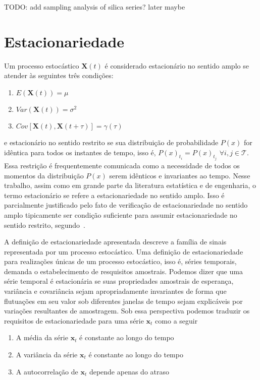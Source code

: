 TODO: add sampling analysis of silica series? later maybe

\section{Estacionariedade}\label{sec:stationarity}

Um processo estocástico $\mathbf{X}(t)$ é considerado estacionário no
sentido amplo se atender às seguintes três condições:

\begin{enumerate}
    \item $E(\mathbf{X}(t)) = \mu$
    \item $Var(\mathbf{X}(t)) = \sigma^2$
    \item $Cov[\mathbf{X}(t), \mathbf{X}(t+\tau)] = \gamma(\tau)$
\end{enumerate}\vspace{.5cm}

e estacionário no sentido restrito se sua distribuição de probabilidade $P(x)$
for idêntica para todos os instantes de tempo, isso é, $P(x)_{t_{i}} = P(x)_{t_{j}}$
$\forall i, j \in \mathcal{T}$. Essa restrição é frequentemente comunicada como
a necessidade de todos os momentos da distribuição $P(x)$ serem idênticos e
invariantes ao tempo. Nesse trabalho, assim como em grande parte da literatura
estatística e de engenharia, o termo estacionário se refere a estacionariedade
no sentido amplo. Isso é parcialmente justificado pelo fato de verificação
de estacionariedade no sentido amplo tipicamente ser condição suficiente para
assumir estacionariedade no sentido restrito, segundo~\cite{random_data}.

A definição de estacionariedade apresentada descreve a família de sinais
representada por um processo estocástico. Uma definição de estacionariedade
para realizações únicas de um processo estocástico, isso é, séries temporais,
demanda o estabelecimento de resquisitos amostrais. Podemos dizer que uma
série temporal é estacionária se suas propriedades amostrais de esperança,
variância e covariância sejam apropriadamente invariantes de forma que
flutuações em seu valor sob diferentes janelas de tempo sejam explicáveis por
variações resultantes de amostragem. Sob essa perspectiva podemos traduzir
os requisitos de estacionariedade para uma série $\mathbf{x}_t$ como a seguir

\begin{enumerate}
    \item A média da série $\mathbf{x}_t$ é constante ao longo do tempo
    \item A variância da série $\mathbf{x}_t$ é constante ao longo do tempo
    \item A autocorrelação de $\mathbf{x}_t$ depende apenas do atraso
\end{enumerate}\vspace{.5cm}

